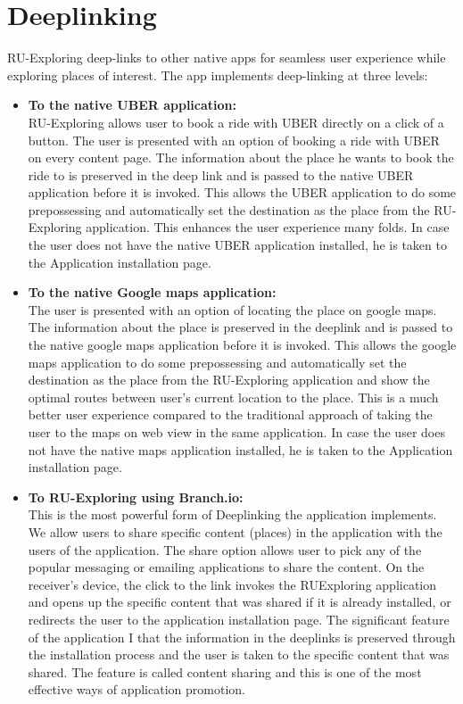\documentclass[a4paper, 11pt]{article}
\begin{document}
\section*{Deeplinking}
RU-Exploring deep-links to other native apps for seamless user experience while exploring places of interest. The app implements deep-linking at three levels:
\begin{itemize}
\item
\textbf{To the native UBER application:}\\RU-Exploring allows user to book a ride with UBER directly on a click of a button. The user is presented with an option of booking a ride with UBER on every content page. The information about the place he wants to book the ride to is preserved in the deep link and is passed to the native UBER application before it is invoked. This allows the UBER application to do some prepossessing and automatically set the destination as the place from the RU-Exploring application. This enhances the user experience many folds. In case the user does not have the native UBER application installed, he is taken to the Application installation page.
\item
\textbf{To the native Google maps application:}\\The user is presented with an option of locating the place on google maps. The information about the place is preserved in the deeplink and is passed to the native google maps application before it is invoked. This allows the google maps application to do some prepossessing and automatically set the destination as the place from the RU-Exploring application and show the optimal routes between user’s current location to the place. This is a much better user experience compared to the traditional approach of taking the user to the maps on web view in the same application. In case the user does not have the native maps application installed, he is taken to the Application installation page.
\item
\textbf{To RU-Exploring using Branch.io:}\\This is the most powerful form of Deeplinking the application implements. We allow users to share specific content (places) in the application with the users of the application. The share option allows user to pick any of the popular messaging or emailing applications to share the content. On the receiver’s device, the click to the link invokes the RUExploring application and opens up the specific content that was shared if it is already installed, or redirects the user to the application installation page. The significant feature of the application I that the information in the deeplinks is preserved through the installation process and the user is taken to the specific content that was shared.  The feature is called content sharing and this is one of the most effective ways of application promotion.
\end{itemize}
\end{document}
